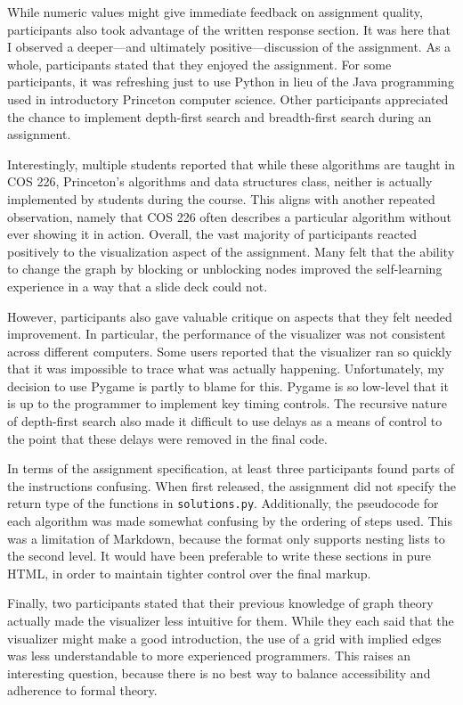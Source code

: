 \documentclass[pageno]{jpaper}
\begin{document}
While numeric values might give immediate feedback on assignment quality, participants also took advantage of the written response section. It was here that I observed a deeper—and ultimately positive—discussion of the assignment. As a whole, participants stated that they enjoyed the assignment. For some participants, it was refreshing just to use Python in lieu of the Java programming used in introductory Princeton computer science. Other participants appreciated the chance to implement depth-first search and breadth-first search during an assignment. 

Interestingly, multiple students reported that while these algorithms are taught in COS 226, Princeton's algorithms and data structures class, neither is actually implemented by students during the course. This aligns with another repeated observation, namely that COS 226 often describes a particular algorithm without ever showing it in action. Overall, the vast majority of participants reacted positively to the visualization aspect of the assignment. Many felt that the ability to change the graph by blocking or unblocking nodes improved the self-learning experience in a way that a slide deck could not.

However, participants also gave valuable critique on aspects that they felt needed improvement. In particular, the performance of the visualizer was not consistent across different computers. Some users reported that the visualizer ran so quickly that it was impossible to trace what was actually happening. Unfortunately, my decision to use Pygame is partly to blame for this. Pygame is so low-level that it is up to the programmer to implement key timing controls. The recursive nature of depth-first search also made it difficult to use delays as a means of control to the point that these delays were removed in the final code.

In terms of the assignment specification, at least three participants found parts of the instructions confusing. When first released, the assignment did not specify the return type of the functions in \texttt{solutions.py}. Additionally, the pseudocode for each algorithm was made somewhat confusing by the ordering of steps used. This was a limitation of Markdown, because the format only supports nesting lists to the second level. It would have been preferable to write these sections in pure HTML, in order to maintain tighter control over the final markup.

Finally, two participants stated that their previous knowledge of graph theory actually made the visualizer less intuitive for them. While they each said that the visualizer might make a good introduction, the use of a grid with implied edges was less understandable to more experienced programmers. This raises an interesting question, because there is no best way to balance accessibility and adherence to formal theory.
\end{document}
